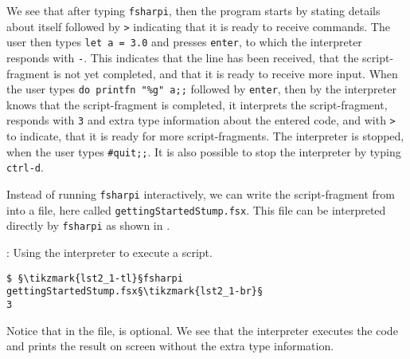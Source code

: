 %
We see that after typing \lstinline[language=console]{fsharpi}, then the program starts by stating details about itself followed by \lstinline{>} indicating that it is ready to receive commands. The user then types \lstinline{let a = 3.0} and presses \lstinline[language=console]{enter}, to which the interpreter responds with \lstinline{-}. This indicates that the line has been received, that the script-fragment is not yet completed, and that it is ready to receive more input. When the user types \lstinline{do printfn "%g" a;;} %
followed by \lstinline[language=console]{enter}, then by \lexeme{;;} the interpreter knows that the script-fragment is completed, it interprets the script-fragment, responds with \lstinline{3} and extra type information about the entered code, and with \lstinline{>} to indicate, that it is ready for more script-fragments. The interpreter is stopped, when the user types \lstinline[language=console]{#quit;;}. It is also possible to stop the interpreter by typing \lstinline[language=console]{ctrl-d}.

Instead of running \lstinline[language=console]{fsharpi} interactively, we can write the script-fragment from  into a file, here called \lstinline[language=console]{gettingStartedStump.fsx}. This file can be interpreted directly by \lstinline[language=console]{fsharpi} as shown in .
%
\begin{codeNOutput}[label=commandlineInterpreter]{: Using the interpreter to execute a script.}
\begin{lstlisting}[language=console,escapechar=§]
$ §\tikzmark{lst2_1-tl}§fsharpi gettingStartedStump.fsx§\tikzmark{lst2_1-br}§
3
\end{lstlisting}%
\end{codeNOutput}
%
%
Notice that in the file, \lexeme{;;} is optional. We see that the interpreter executes the code and prints the result on screen without the extra type information.

